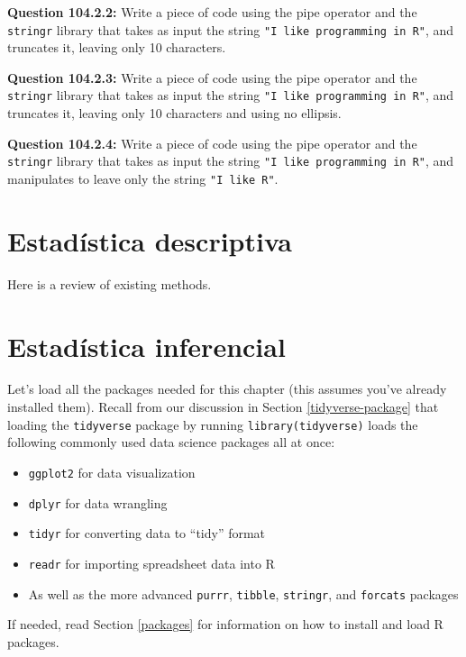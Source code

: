\documentclass[
]{book}
\providecommand{\tightlist}{%
  \setlength{\itemsep}{0pt}\setlength{\parskip}{0pt}}
\begin{document}
\textbf{Question 104.2.2:} Write a piece of code using the pipe operator and the \texttt{stringr} library that takes as input the string \texttt{"I\ like\ programming\ in\ R"}, and truncates it, leaving only 10 characters.

\textbf{Question 104.2.3:} Write a piece of code using the pipe operator and the \texttt{stringr} library that takes as input the string \texttt{"I\ like\ programming\ in\ R"}, and truncates it, leaving only 10 characters and using no ellipsis.

\textbf{Question 104.2.4:} Write a piece of code using the pipe operator and the \texttt{stringr} library that takes as input the string \texttt{"I\ like\ programming\ in\ R"}, and manipulates to leave only the string \texttt{"I\ like\ R"}.

\hypertarget{estaduxedstica-descriptiva}{%
\chapter{Estadística descriptiva}\label{estaduxedstica-descriptiva}}

Here is a review of existing methods.

\hypertarget{estaduxedstica-inferencial}{%
\chapter{Estadística inferencial}\label{estaduxedstica-inferencial}}

Let's load all the packages needed for this chapter (this assumes you've already installed them). Recall from our discussion in Section \ref{tidyverse-package} that loading the \texttt{tidyverse} package by running \texttt{library(tidyverse)} loads the following commonly used data science packages all at once:

\begin{itemize}
\tightlist
\item
  \texttt{ggplot2} for data visualization
\item
  \texttt{dplyr} for data wrangling
\item
  \texttt{tidyr} for converting data to ``tidy'' format
\item
  \texttt{readr} for importing spreadsheet data into R
\item
  As well as the more advanced \texttt{purrr}, \texttt{tibble}, \texttt{stringr}, and \texttt{forcats} packages
\end{itemize}

If needed, read Section \ref{packages} for information on how to install and load R packages.
\end{document}
